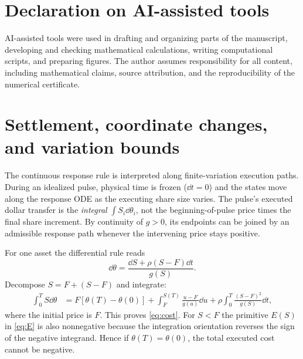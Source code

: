 \documentclass[review,hidelinks,onefignum,onetabnum]{siamonline250211}
\begin{document}
\section*{Declaration on AI-assisted tools}
AI-assisted tools were used in drafting and organizing parts of the manuscript, developing and checking mathematical calculations, writing computational scripts, and preparing figures. The author assumes responsibility for all content, including mathematical claims, source attribution, and the reproducibility of the numerical certificate.

\appendix
\section{Settlement, coordinate changes, and variation bounds}\label{app:accounting}
The continuous response rule is interpreted along finite-variation execution paths. During an idealized pulse, physical time is frozen ($\dd t=0$) and the states move along the response ODE as the executing share size varies. The pulse's executed dollar transfer is the \emph{integral} $\int S_i\dd\theta_i$, not the beginning-of-pulse price times the final share increment. By continuity of $g>0$, its endpoints can be joined by an admissible response path whenever the intervening price stays positive.

For one asset the differential rule reads
\begin{equation}\label{eq:appendix-s}
\dd\theta=\frac{\dd S+\rho(S-F)\dd t}{g(S)}.
\end{equation}
Decompose $S=F+(S-F)$ and integrate:
\begin{align*}
\int_0^T S\dd\theta
&=F[\theta(T)-\theta(0)]
+\int_F^{S(T)}\frac{u-F}{g(u)}\dd u
+\rho\int_0^T\frac{(S-F)^2}{g(S)}\dd t,
\end{align*}
where the initial price is $F$. This proves \eqref{eq:cost}. For $S<F$ the primitive $E(S)$ in \eqref{eq:E} is also nonnegative because the integration orientation reverses the sign of the negative integrand. Hence if $\theta(T)=\theta(0)$, the total executed cost cannot be negative.
\end{document}
